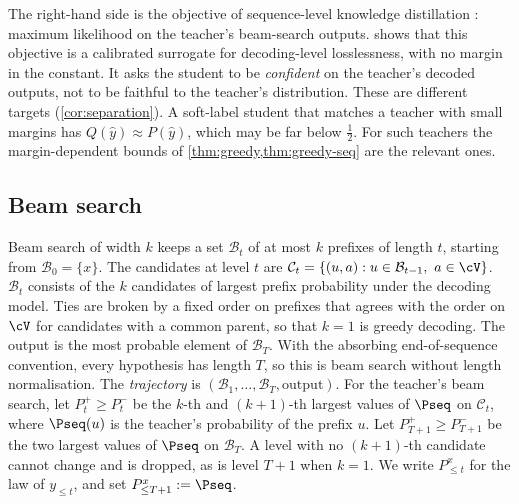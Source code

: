 \noindent
The right-hand side is the objective of sequence-level knowledge distillation \citep{kim2016sequence}:
maximum likelihood on the teacher's beam-search outputs.  shows that this objective is
a calibrated surrogate for decoding-level losslessness, with no margin in the constant. It asks the student
to be \emph{confident} on the teacher's decoded outputs, not to be faithful to the teacher's
distribution. These are different targets (\cref{cor:separation}). A soft-label student that matches a
teacher with small margins has $Q(\hat y)\approx P(\hat y)$, which may be far below $\frac12$. For such teachers
the margin-dependent bounds of \cref{thm:greedy,thm:greedy-seq} are the relevant ones.

\subsection{Beam search}\label{sec:beam}

Beam search of width $k$ keeps a set $\mathcal B_t$ of at most $k$ prefixes of length $t$, starting from
$\mathcal B_0=\{x\}$. The candidates at level $t$ are $\mathcal C_t=\{(u,a):u\in\mathcal B_{t-1},\ a\in\cV\}$. $\mathcal B_t$ consists of
the $k$ candidates of largest prefix probability under the decoding model. Ties are broken by a fixed
order on prefixes that agrees with the order on $\cV$ for candidates with a common parent, so that $k=1$
is greedy decoding. The output is the most probable element of $\mathcal B_T$. With the absorbing end-of-sequence
convention, every hypothesis has length $T$, so this is beam search without length normalisation. The
\emph{trajectory} is $(\mathcal B_1,\dots,\mathcal B_T,\text{output})$. For the teacher's beam search, let $P^+_t\ge P^-_t$ be
the $k$-th and $(k+1)$-th largest values of $\Pseq$ on $\mathcal C_t$, where $\Pseq(u)$ is the teacher's probability of
the prefix $u$. Let $P^+_{T+1}\ge P^-_{T+1}$ be the two largest values of $\Pseq$ on $\mathcal B_T$. A level with no
$(k+1)$-th candidate cannot change and is dropped, as is level $T+1$ when $k=1$. We write $P^x_{\le t}$ for
the law of $y_{\le t}$, and set $P^x_{\le T+1}:=\Pseq$.

